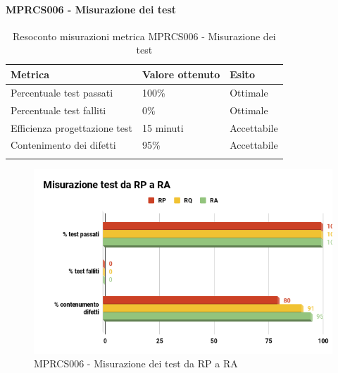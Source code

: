 \paragraph{MPRCS006 - Misurazione dei test}
\begin{center}
	\centering
	\renewcommand{\arraystretch}{1.5}
	\begin{longtable}{  p{5cm}  p{5cm} p{3cm}  }
		\rowcolor{tableHeadYellow}
		\textbf{Metrica}   & \textbf{Valore ottenuto} & \textbf{Esito} \\ 
		\endhead
		Percentuale test passati     & 100\%  & Ottimale \\
		Percentuale test falliti     & 0\% & Ottimale \\
		Efficienza progettazione test    & 15 minuti & Accettabile \\
		Contenimento dei difetti    & 95\% & Accettabile \\
		\rowcolor{white}
		\caption{Resoconto misurazioni metrica MPRCS006 - Misurazione dei test}
	\end{longtable}
\end{center}
\begin{figure}[H]
	\centering
	\includegraphics[width=13cm,keepaspectratio]{../includes/pics/MisurazioneRA.png}
	\caption{\label{fig:mission}MPRCS006 - Misurazione dei test da RP a RA}
\end{figure}
\pagebreak
